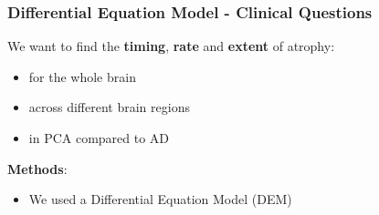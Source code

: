 \documentclass[10pt,xcolor=table]{beamer}
\begin{document}
\begin{frame}
\frametitle{Differential Equation Model - Clinical Questions}

We want to find the \textbf{timing}, \textbf{rate} and \textbf{extent} of atrophy:
\begin{itemize}
\item for the whole brain
\item across different brain regions 
\item in PCA compared to AD 
\end{itemize}

\textbf{Methods}:
\begin{itemize}
 \item We used a Differential Equation Model (DEM)
\end{itemize}


\end{frame}
\end{document}

